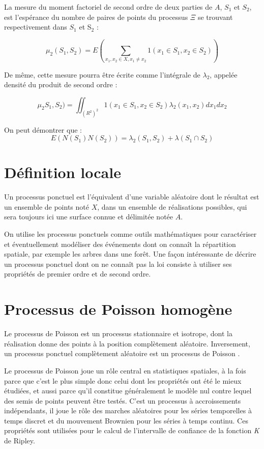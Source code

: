 \documentclass[
  11pt,
  french,
  A4paper,
  extrafontsizes,onecolumn,openright
  ]{memoir}
\theoremstyle{definition}
\theoremstyle{definition}
\theoremstyle{definition}
\theoremstyle{remark}
\begin{document}
La mesure du moment factoriel de second ordre de deux parties de \(A\),
\(S_1\) et \(S_2\), est l'espérance du nombre de paires de points du
processus \(\Xi\) se trouvant respectivement dans \(S_1\) et S\(_2\) :

\begin{equation}
  \mu_2(S_1,S_2 ) = E \left(\sum_{x_1 ,x_2 \in X, x_1 \ne x_2}{1(x_1 \in S_1, x_2 \in S_2)} \right)
\end{equation}

De même, cette mesure pourra être écrite comme l'intégrale de
\(\lambda_2\), appelée densité du produit de second ordre :

\begin{equation}
  \mu_2 S_1,S_2 ) = \iint_{(R^2)^2}{1(x_1 \in S_1, x_2 \in S_2) \lambda_2(x_1, x_2)dx_1 dx_2}
\end{equation}

On peut démontrer \autocite{Moller2004} que :
\[ E(N(S_1 )N(S_2 )) = \lambda_2(S_1,S_2)+\lambda(S_1 \cap S_2)\]

\section{Définition locale}\label{definition-locale}

Un processus ponctuel est l'équivalent d'une variable aléatoire dont le
résultat est un ensemble de points noté \(X\), dans un ensemble de
réalisations possibles, qui sera toujours ici une surface connue et
délimitée notée \(A\).

On utilise les processus ponctuels comme outils mathématiques pour
caractériser et éventuellement modéliser des événements dont on connaît
la répartition spatiale, par exemple les arbres dans une forêt. Une
façon intéressante de décrire un processus ponctuel dont on ne connaît
pas la loi consiste à utiliser ses propriétés de premier ordre et de
second ordre.

\section{Processus de Poisson
homogène}\label{processus-de-poisson-homogene}

Le processus de Poisson est un processus stationnaire et isotrope, dont
la réalisation donne des points à la position complètement aléatoire.
Inversement, un processus ponctuel complètement aléatoire est un
processus de Poisson \autocite[démonstration :][pp.~51-52]{Diggle1983}.

Le processus de Poisson joue un rôle central en statistiques spatiales,
à la fois parce que c'est le plus simple donc celui dont les propriétés
ont été le mieux étudiées, et aussi parce qu'il constitue généralement
le modèle nul contre lequel des semis de points peuvent être testés.
C'est un processus à accroissements indépendants, il joue le rôle des
marches aléatoires pour les séries temporelles à temps discret et du
mouvement Brownien pour les séries à temps continu. Ces propriétés sont
utilisées pour le calcul de l'intervalle de confiance de la fonction
\emph{K} de Ripley.
\end{document}
